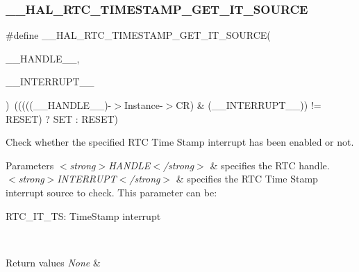 \subsubsection{\texorpdfstring{\+\_\+\+\_\+\+H\+A\+L\+\_\+\+R\+T\+C\+\_\+\+T\+I\+M\+E\+S\+T\+A\+M\+P\+\_\+\+G\+E\+T\+\_\+\+I\+T\+\_\+\+S\+O\+U\+R\+CE}{\_\_HAL\_RTC\_TIMESTAMP\_GET\_IT\_SOURCE}}
{\footnotesize\ttfamily \#define \+\_\+\+\_\+\+H\+A\+L\+\_\+\+R\+T\+C\+\_\+\+T\+I\+M\+E\+S\+T\+A\+M\+P\+\_\+\+G\+E\+T\+\_\+\+I\+T\+\_\+\+S\+O\+U\+R\+CE(\begin{DoxyParamCaption}\item[{}]{\+\_\+\+\_\+\+H\+A\+N\+D\+L\+E\+\_\+\+\_\+,  }\item[{}]{\+\_\+\+\_\+\+I\+N\+T\+E\+R\+R\+U\+P\+T\+\_\+\+\_\+ }\end{DoxyParamCaption})~(((((\+\_\+\+\_\+\+H\+A\+N\+D\+L\+E\+\_\+\+\_\+)-\/$>$Instance-\/$>$CR) \& (\+\_\+\+\_\+\+I\+N\+T\+E\+R\+R\+U\+P\+T\+\_\+\+\_\+)) != R\+E\+S\+ET) ? S\+ET \+: R\+E\+S\+ET)}



Check whether the specified R\+TC Time Stamp interrupt has been enabled or not. 


\begin{DoxyParams}{Parameters}
{\em $<$strong$>$\+H\+A\+N\+D\+L\+E$<$/strong$>$} & specifies the R\+TC handle. \\
\hline
{\em $<$strong$>$\+I\+N\+T\+E\+R\+R\+U\+P\+T$<$/strong$>$} & specifies the R\+TC Time Stamp interrupt source to check. This parameter can be\+: \begin{DoxyItemize}
\item R\+T\+C\+\_\+\+I\+T\+\_\+\+TS\+: Time\+Stamp interrupt \end{DoxyItemize}
\\
\hline
\end{DoxyParams}

\begin{DoxyRetVals}{Return values}
{\em None} & \\
\hline
\end{DoxyRetVals}
